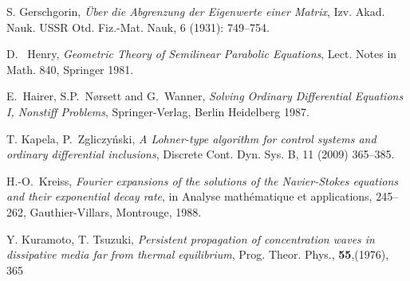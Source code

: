 \begin{thebibliography}{HNW00}
 S. Gerschgorin, \emph{\"Uber die Abgrenzung der Eigenwerte einer Matrix}, Izv. Akad. Nauk. USSR Otd. Fiz.-Mat. Nauk, 6 (1931): 749–754.



 D. \ Henry, \emph{Geometric Theory of Semilinear
Parabolic Equations}, Lect. Notes in Math. 840, Springer 1981.



 E.\ Hairer, S.P.\ N\o rsett and G.\ Wanner,
\emph{Solving Ordinary Differential Equations I, Nonstiff
Problems}, Springer-Verlag, Berlin Heidelberg 1987.




 T. Kapela, P.\ Zgliczy\'nski, \emph{A Lohner-type algorithm for control systems and ordinary
differential inclusions}, Discrete Cont. Dyn. Sys. B, 11 (2009) 365--385.


 H.-O.\  Kreiss, \emph{Fourier expansions of the
solutions of the Navier-Stokes equations and their exponential
decay rate}, in  Analyse math\'ematique et applications, 245--262, Gauthier-Villars, Montrouge, 1988.

 Y. Kuramoto, T. Tsuzuki,
\emph{Persistent propagation of concentration waves in dissipative media far from thermal equilibrium},
Prog. Theor. Phys., {\bf 55},(1976), 365


\end{thebibliography}
